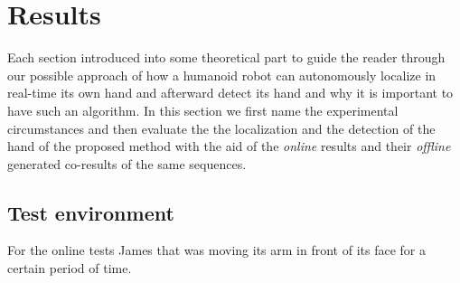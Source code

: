 %
%
\section{Results}\label{results}
Each section introduced into some theoretical part to guide the reader through our possible approach of how a humanoid robot can autonomously localize in real-time its own hand and afterward detect its hand and why it is important to have such an algorithm. In this section we first name the experimental circumstances and then evaluate the the localization and the detection of the hand of the proposed method with the aid of the \textit{online} results and their \textit{offline} generated co-results of the same sequences.
%

%
%
\subsection{Test environment}\label{results:testenv}
For the online tests James that was moving its arm in front of its face for a certain period of time. 
%
%
%
